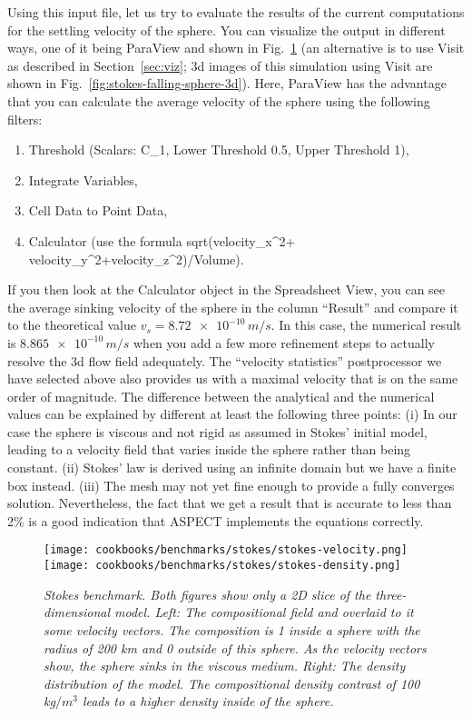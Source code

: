 \documentclass{article}
\newcommand{\aspect}{\textsc{ASPECT}}
\begin{document}
Using this input file, let us try to evaluate the results of the current
computations for the settling velocity of the sphere. You can visualize the output in different
ways, one of it being ParaView and shown in
Fig.~\ref{fig:stokes-falling-sphere-2d} (an alternative is to use Visit as
described in Section~\ref{sec:viz}; 3d images of this simulation using Visit
are shown in Fig.~\ref{fig:stokes-falling-sphere-3d}).
Here, ParaView has the advantage that you can calculate the average velocity
of the sphere using the following filters:
\begin{enumerate}
 \item Threshold (Scalars: C\_1, Lower Threshold 0.5, Upper Threshold 1),
 \item Integrate Variables,
 \item Cell Data to Point Data,
 \item Calculator (use the formula sqrt(velocity\_x\textasciicircum2+
       velocity\_y\textasciicircum2+velocity\_z\textasciicircum2)/Volume).
\end{enumerate}
If you then look at
the Calculator object in the Spreadsheet View, you can see the average sinking
velocity of the sphere in the column ``Result'' and compare it to the theoretical
value $v_s = \num{8.72e-10} \, \si{m}/\si{s}$.
In this case, the numerical result is $\num{8.865e-10} \,
\si{m}/\si{s}$ when you add a few more refinement steps to actually resolve
the 3d flow field adequately. The ``velocity statistics'' postprocessor we have
selected above also provides us with a maximal velocity that is on the same
order of magnitude. The difference between the analytical and the numerical
values can be explained by different at least the following three points:
(i) In our case the sphere is viscous and not rigid as assumed in Stokes' initial model, leading to
a velocity field that varies inside the sphere rather than being constant.
(ii) Stokes' law is derived using an infinite domain but we have a finite box
instead. (iii) The mesh may not yet fine enough to provide a fully converges
solution. Nevertheless, the fact that we get a result that is accurate to less
than 2\% is a good indication that \aspect{} implements the equations correctly.

\begin{figure}
  \begin{center}
    \texttt{[image: cookbooks/benchmarks/stokes/stokes-velocity.png]}
    \hfill
    \texttt{[image: cookbooks/benchmarks/stokes/stokes-density.png]}
  \end{center}
  \caption{\it Stokes benchmark. Both figures show only a 2D slice of the
      three-dimensional model.
      Left: The compositional field and overlaid to it some velocity vectors.
      The composition is 1 inside a sphere with the radius of 200 km and 0
      outside of this sphere. As the velocity vectors show, the sphere sinks
      in the viscous medium.
      Right: The density distribution of the model. The compositional density
      contrast of 100 kg$/\si{m}^3$ leads to a higher density inside of the
      sphere.}
  \label{fig:stokes-falling-sphere-2d}
\end{figure}
\end{document}

